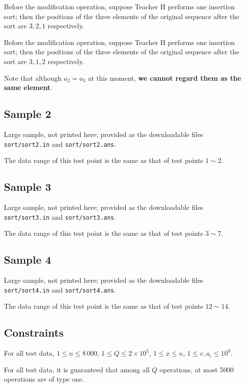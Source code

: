 \documentclass[11pt]{article}
\begin{document}
Before the modification operation, suppose Teacher H performs one insertion
sort;
then the positions of the three elements of the original sequence after the
sort are $3, 2, 1$ respectively.

Before the modification operation, suppose Teacher H performs one insertion
sort;
then the positions of the three elements of the original sequence after the
sort are $3, 1, 2$ respectively.

Note that although $a_2 = a_3$ at this moment,
\textbf{we cannot regard them as the same element}.

\subsection*{Sample 2}

Large sample, not printed here;
provided as the downloadable files \texttt{sort/sort2.in} and \texttt{sort/sort2.ans}.

The data range of this test point is the same as that of test points
$1 \sim 2$.

\subsection*{Sample 3}

Large sample, not printed here;
provided as the downloadable files \texttt{sort/sort3.in} and \texttt{sort/sort3.ans}.

The data range of this test point is the same as that of test points
$3 \sim 7$.

\subsection*{Sample 4}

Large sample, not printed here;
provided as the downloadable files \texttt{sort/sort4.in} and \texttt{sort/sort4.ans}.

The data range of this test point is the same as that of test points
$12 \sim 14$.

\subsection*{Constraints}

For all test data,
$1 \le n \le 8\,000$, $1 \le Q \le 2 \times 10^5$, $1 \le x \le n$,
$1 \le v, a_i \le 10^9$.

For all test data, it is guaranteed that among all $Q$ operations, at most
5000 operations are of type one.
\end{document}

